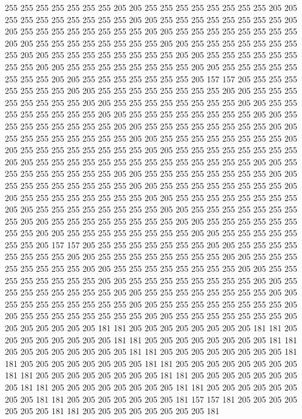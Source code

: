 255 255 255 255 255 255 255 205 205 255 255 255 255 255 255 255 255 205 205 255
255 255 255 255 255 255 255 205 205 255 255 255 255 255 255 255 255 205 205 255
255 255 255 255 255 255 255 205 205 255 255 255 255 255 255 255 255 205 205 255
255 255 255 255 255 255 255 205 205 255 255 255 255 255 255 255 255 205 205 255
255 255 255 255 255 255 255 205 205 255 255 255 255 255 255 255 255 205 205 255
255 255 255 255 255 255 255 205 205 255 255 255 255 255 255 255 255 205 205 255
255 255 255 255 255 255 205 157 157 205 255 255 255 255 255 255 255 205 205 255
255 255 255 255 255 255 255 205 205 255 255 255 255 255 255 255 255 205 205 255
255 255 255 255 255 255 255 205 205 255 255 255 255 255 255 255 255 205 205 255
255 255 255 255 255 255 255 205 205 255 255 255 255 255 255 255 255 205 205 255
255 255 255 255 255 255 255 205 205 255 255 255 255 255 255 255 255 205 205 255
255 255 255 255 255 255 255 205 205 255 255 255 255 255 255 255 255 205 205 255
255 255 255 255 255 255 255 205 205 255 255 255 255 255 255 255 255 255 255 255
255 255 255 205 205 255 255 255 255 255 255 255 255 205 205 255 255 255 255 255
255 255 255 205 205 255 255 255 255 255 255 255 255 205 205 255 255 255 255 255
255 255 255 205 205 255 255 255 255 255 255 255 255 205 205 255 255 255 255 255
255 255 255 205 205 255 255 255 255 255 255 255 255 205 205 255 255 255 255 255
255 255 255 205 205 255 255 255 255 255 255 255 255 205 205 255 255 255 255 255
255 255 255 205 205 255 255 255 255 255 255 255 255 205 205 255 255 255 255 255
255 255 205 157 157 205 255 255 255 255 255 255 255 205 205 255 255 255 255 255
255 255 255 205 205 255 255 255 255 255 255 255 255 205 205 255 255 255 255 255
255 255 255 205 205 255 255 255 255 255 255 255 255 205 205 255 255 255 255 255
255 255 255 205 205 255 255 255 255 255 255 255 255 205 205 255 255 255 255 255
255 255 255 205 205 255 255 255 255 255 255 255 255 205 205 255 255 255 255 255
255 255 255 205 205 255 255 255 255 255 255 255 255 205 205 255 255 255 255 255
255 255 255 205 205 255 255 255 255 255 255 255 205 205 205 205 205 205 205 181
181 205 205 205 205 205 205 205 205 181 181 205 205 205 205 205 205 205 205 181
181 205 205 205 205 205 205 205 205 181 181 205 205 205 205 205 205 205 205 181
181 205 205 205 205 205 205 205 205 181 181 205 205 205 205 205 205 205 205 181
181 205 205 205 205 205 205 205 205 181 181 205 205 205 205 205 205 205 205 181
181 205 205 205 205 205 205 205 205 181 181 205 205 205 205 205 205 205 205 181
181 205 205 205 205 205 205 205 205 181 181 205 205 205 205 205 205 205 181 157
157 181 205 205 205 205 205 205 205 181 181 205 205 205 205 205 205 205 205 181
